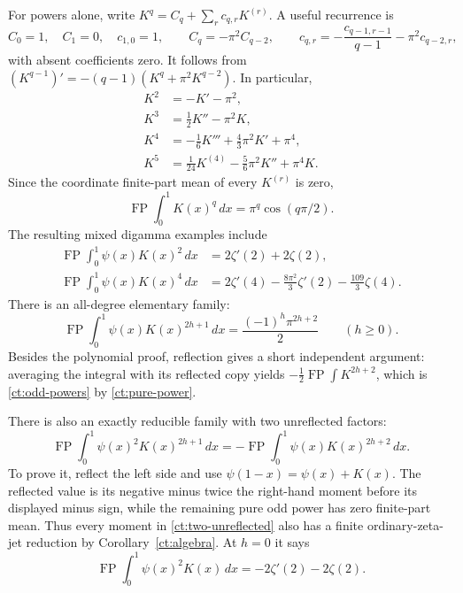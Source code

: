 For powers alone, write
$K^q=C_q+\sum_rc_{q,r}K^{(r)}$. A useful recurrence is
\[
 C_0=1,\quad C_1=0,\quad c_{1,0}=1,\qquad
 C_q=-\pi^2 C_{q-2},\qquad
 c_{q,r}=-\frac{c_{q-1,r-1}}{q-1}-\pi^2c_{q-2,r},
\]
with absent coefficients zero. It follows from
$(K^{q-1})'=-(q-1)(K^q+\pi^2K^{q-2})$.
In particular,
\begin{align*}
 K^2&=-K'-\pi^2,\\
 K^3&=\tfrac12K''-\pi^2K,\\
 K^4&=-\tfrac16K'''+\tfrac43\pi^2K'+\pi^4,\\
 K^5&=\tfrac1{24}K^{(4)}-\tfrac56\pi^2K''+\pi^4K.
\end{align*}
Since the coordinate finite-part mean of every $K^{(r)}$ is zero,
\begin{equation}\label{ct:pure-power}
 \operatorname{FP}\int_0^1K(x)^q\,dx
       =\pi^q\cos(q\pi/2).
\end{equation}
The resulting mixed digamma examples include
\begin{align}
 \operatorname{FP}\int_0^1\psi(x)K(x)^2\,dx
     &=2\zeta'(2)+2\zeta(2),\label{ct:cubic-reflected}\\
 \operatorname{FP}\int_0^1\psi(x)K(x)^4\,dx
     &=2\zeta'(4)-\frac{8\pi^2}{3}\zeta'(2)
                       -\frac{109}{3}\zeta(4).\label{ct:quintic-reflected}
\end{align}
There is an all-degree elementary family:
\begin{equation}\label{ct:odd-powers}
 \boxed{\displaystyle
 \operatorname{FP}\int_0^1\psi(x)K(x)^{2h+1}\,dx
       =\frac{(-1)^h\pi^{2h+2}}2\qquad(h\ge0).}
\end{equation}
Besides the polynomial proof, reflection gives a short independent
argument: averaging the integral with its reflected copy yields
$-\tfrac12\operatorname{FP}\int K^{2h+2}$, which is
\eqref{ct:odd-powers} by \eqref{ct:pure-power}.

There is also an exactly reducible family with two unreflected factors:
\begin{equation}\label{ct:two-unreflected}
 \operatorname{FP}\int_0^1\psi(x)^2K(x)^{2h+1}\,dx
   =-\operatorname{FP}\int_0^1\psi(x)K(x)^{2h+2}\,dx.
\end{equation}
To prove it, reflect the left side and use
$\psi(1-x)=\psi(x)+K(x)$. The reflected value is its negative minus
twice the right-hand moment before its displayed minus sign, while
the remaining pure odd power has zero finite-part mean. Thus every
moment in \eqref{ct:two-unreflected} also has a finite ordinary-zeta-jet
reduction by Corollary~\ref{ct:algebra}. At $h=0$ it says
\[
 \operatorname{FP}\int_0^1\psi(x)^2K(x)\,dx
       =-2\zeta'(2)-2\zeta(2).
\]

